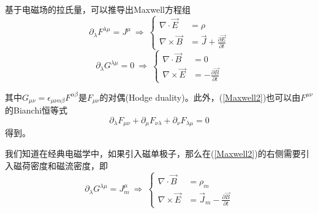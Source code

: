 基于电磁场的拉氏量，可以推导出Maxwell方程组
\begin{equation}\label{Maxwell1}
    \partial_\lambda F^{\lambda\mu}=J^\mu
    \ \Rightarrow\ \left\{
        \begin{split}
            \nabla\cdot\vec{E}&=\rho \\
            \nabla\times\vec{B}&=\vec{J}+\frac{\partial\vec{E}}{\partial t}
        \end{split}
        \right. 
\end{equation}
\begin{equation}\label{Maxwell2}
    \partial_\lambda G^{\lambda\mu}=0
    \ \Rightarrow\ \left\{
        \begin{split}
            \nabla\cdot\vec{B}&=0 \\
            \nabla\times\vec{E}&=-\frac{\partial\vec{B}}{\partial t}
        \end{split}
    \right.
\end{equation}

其中$G_{\mu\nu}=\epsilon_{\mu\nu\alpha\beta}F^{\alpha\beta}$是$F_{\mu\nu}$的对偶(Hodge duality)。此外，(\ref{Maxwell2})也可以由$F^{\mu\nu}$的Bianchi恒等式$$\partial_\lambda F_{\mu\nu}+\partial_\mu F_{\nu\lambda}+\partial_\nu F_{\lambda\mu}=0$$得到。

我们知道在经典电磁学中，如果引入磁单极子，那么在(\ref{Maxwell2})的右侧需要引入磁荷密度和磁流密度，即
\begin{equation}
    \partial_\lambda G^{\lambda\mu}=J_m^\mu
    \ \Rightarrow\ \left\{
        \begin{split}
            \nabla\cdot\vec{B}&=\rho_m \\
            \nabla\times\vec{E}&=\vec{J}_m-\frac{\partial\vec{B}}{\partial t}
        \end{split}
    \right.
\end{equation}